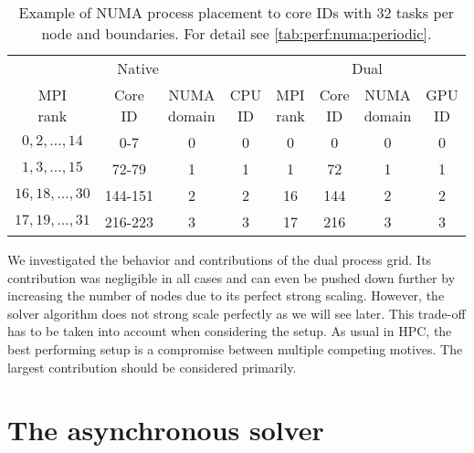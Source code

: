 \begin{table}[h]
\centering
\begin{tabular}{cccccccc}
\multicolumn{4}{c}{Native} & \multicolumn{4}{c}{Dual} \\
\cmidrule(lr){1-4}
\cmidrule(lr){5-8} 
\makecell{MPI\\rank} &
\makecell{Core\\ID} &
\makecell{NUMA\\domain} &
\makecell{CPU\\ID} &
\makecell{MPI\\rank} &
\makecell{Core\\ID} &
\makecell{NUMA\\domain} &
\makecell{GPU\\ID} \\
\cmidrule(lr){1-4}
\cmidrule(lr){5-8} 
$0,2, \ldots, 14$   & 0-7     & 0 & 0 & 0  & 0   & 0 & 0 \\
$1,3, \ldots , 15$  & 72-79   & 1 & 1 & 1  & 72  & 1 & 1 \\
$16,18, \ldots, 30$ & 144-151 & 2 & 2 & 16 & 144 & 2 & 2 \\
$17,19, \ldots, 31$ & 216-223 & 3 & 3 & 17 & 216 & 3 & 3 \\
\end{tabular}
\caption{Example of NUMA process placement to core IDs with \num{32} tasks per node and \Cstar boundaries. For detail see \cref{tab:perf:numa:periodic}.}
\label{tab:perf:numa:cstar}
\end{table}

We investigated the behavior and contributions of the dual process grid.
Its contribution was negligible in all cases and can even be pushed down further by increasing the number of nodes due to its perfect strong scaling.
However, the solver algorithm does not strong scale perfectly as we will see later.
This trade-off has to be taken into account when considering the setup.
As usual in HPC, the best performing setup is a compromise between multiple competing motives.
The largest contribution should be considered primarily.

\section{The asynchronous solver}
\label{sec:perf:solver:async}

